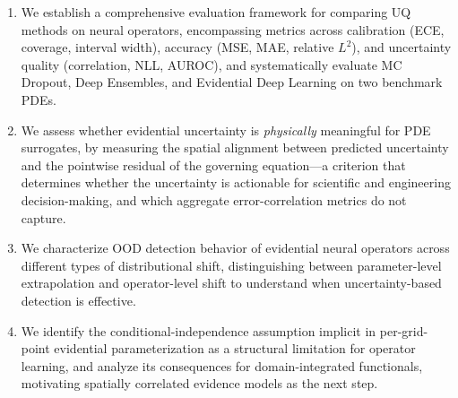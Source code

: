 \begin{enumerate}
    \item We establish a comprehensive evaluation framework for comparing UQ methods on neural operators,
    encompassing metrics across calibration (ECE, coverage, interval width), accuracy (MSE, MAE, relative $L^2$), and
    uncertainty quality (correlation, NLL, AUROC), and systematically evaluate MC Dropout, Deep Ensembles, and Evidential Deep Learning on two benchmark PDEs.

    \item We assess whether evidential uncertainty is \emph{physically} meaningful for PDE surrogates, by
    measuring the spatial alignment between predicted uncertainty and the pointwise residual of the governing
    equation---a criterion that determines whether the uncertainty is actionable for scientific and engineering
    decision-making, and which aggregate error-correlation metrics do not capture.

    \item We characterize OOD detection behavior of evidential neural operators across different types of
    distributional shift, distinguishing between parameter-level extrapolation and operator-level shift to
    understand when uncertainty-based detection is effective.

    \item We identify the conditional-independence assumption implicit in per-grid-point evidential
    parameterization as a structural limitation for operator learning, and analyze its consequences for
    domain-integrated functionals, motivating spatially correlated evidence models as the next step.
\end{enumerate}
